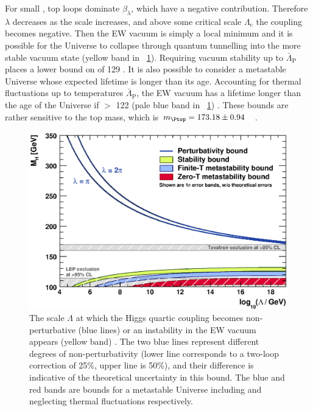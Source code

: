 For small \mH, top loops dominate $\beta_{\lambda}$, which have a negative 
contribution. Therefore $\lambda$ decreases as the scale increases, and above some 
critical scale $\Lambda_{\text{c}}$ the coupling becomes negative. Then the EW 
vacuum is simply a local minimum and it is possible for the Universe to collapse through
quantum tunnelling into the more stable vacuum state (yellow band in 
\Figure~\ref{fig:theory_constraints}). Requiring vacuum stability up to 
$\bar{\Lambda}_{\text{P}}$ places a lower bound on \mH of \unit{129}{\GeV} 
\cite{Ellis:2009}. 
It is also possible to consider a metastable Universe whose expected lifetime is longer 
than its age. Accounting for thermal fluctuations up to temperatures 
\about$\bar{\Lambda}_{\text{P}}$, the EW vacuum has a lifetime longer than the age 
of the Universe if \mH $>$ \unit{122}{\GeV} (pale blue band in 
\Figure~\ref{fig:theory_constraints}) \cite{Ellis:2009}. These bounds are rather 
sensitive to the top mass, which is 
\unit{$m_{\Ptop} = 173.18 \pm 0.94$}{\GeV} \cite{TopMass}.

\begin{figure}
	\includegraphics[width=\mediumfigwidth]{tex/motivation/theory_constraints}
	\caption{The scale $\Lambda$ at which the Higgs quartic coupling becomes 
	non-perturbative (blue lines) or an instability in the EW vacuum appears
	(yellow band) \cite{Ellis:2009}. The two blue lines represent different degrees of 
	non-perturbativity (lower line corresponds to a two-loop correction of 25\%, upper 
	line is 50\%), and their difference is indicative of the theoretical uncertainty in 
	this bound. The blue and red bands are bounds for a metastable Universe including and
	neglecting thermal fluctuations respectively.}
	\label{fig:theory_constraints}
\end{figure}
